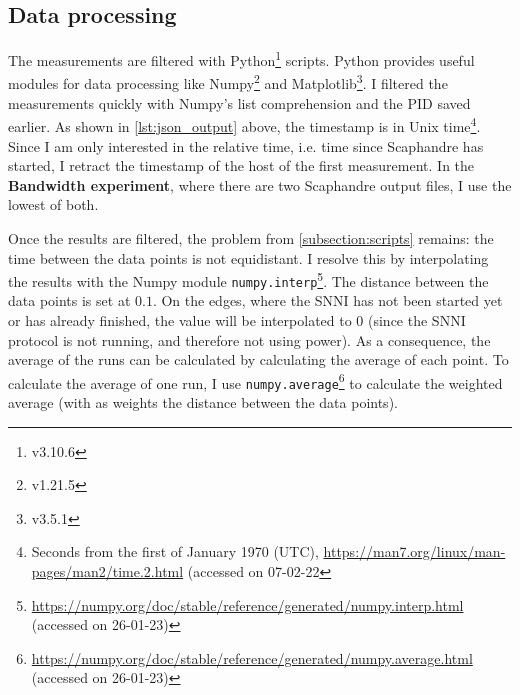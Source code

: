 \documentclass[../thesis.tex]{subfiles}
\begin{document}
\subsection{Data processing}
The measurements are filtered with Python\footnote{v3.10.6} scripts. Python provides useful modules for data processing like Numpy\footnote{v1.21.5} and Matplotlib\footnote{v3.5.1}. I filtered the measurements quickly with Numpy's list comprehension and the PID saved earlier. As shown in \autoref{lst:json_output} above, the timestamp is in Unix time\footnote{Seconds from the first of January 1970 (UTC), \url{https://man7.org/linux/man-pages/man2/time.2.html} (accessed on 07-02-22}. Since I am only interested in the relative time, i.e. time since Scaphandre has started, I retract the timestamp of the host of the first measurement. In the \textbf{Bandwidth experiment}, where there are two Scaphandre output files, I use the lowest of both. 

Once the results are filtered, the problem from \autoref{subsection:scripts} remains: the time between the data points is not equidistant. I resolve this by interpolating the results with the Numpy module \verb|numpy.interp|\footnote{\url{https://numpy.org/doc/stable/reference/generated/numpy.interp.html} (accessed on 26-01-23)}. The distance between the data points is set at $0.1$. On the edges, where the SNNI has not been started yet or has already finished, the value will be interpolated to 0 (since the SNNI protocol is not running, and therefore not using power). As a consequence, the average of the runs can be calculated by calculating the average of each point. To calculate the average of one run, I use \verb|numpy.average|\footnote{\url{https://numpy.org/doc/stable/reference/generated/numpy.average.html} (accessed on 26-01-23)} to calculate the weighted average (with as weights the distance between the data points). 
\end{document}
